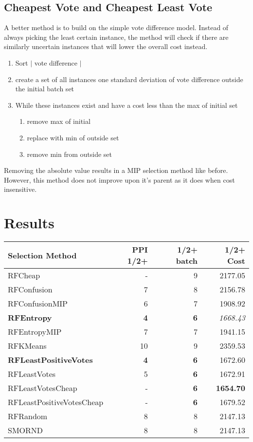 \documentclass[10pt,a4pape r]{article}
\begin{document}
\subsection{Cheapest Vote and Cheapest Least Vote}
A better method is to build on the simple vote difference model. Instead of always picking the least certain instance, the method will check if there are similarly uncertain instances that will lower the overall cost instead.
\begin{enumerate}
 \item Sort $\vert$  vote difference $\vert$
 \item create a set of all instances one standard deviation of vote difference outside the initial batch set
 \item While these instances exist and have a cost less than the max of initial set
 \begin{enumerate}
  \item remove max of initial
  \item replace with min of outside set
  \item remove min from outside set
  \end{enumerate}
\end{enumerate}

Removing the absolute value results in a MIP selection method like before. However, this method does not improve upon it's parent as it does when cost insensitive. \\ 

\section{Results}
 \begin{centering}
\begin{small}
\begin{tabular}{l|rrr}
Selection Method&	PPI 1/2+&	1/2+ batch&	1/2+ Cost\\\hline
RFCheap&	-&	9&	2177.05\\
RFConfusion &	7&	8&	2156.78\\
RFConfusionMIP&	6&	7&	1908.92\\
\textbf{RFEntropy}&	\textbf{4}&	\textbf{6}&	\em{1668.43}\\
RFEntropyMIP&	7&	7&	1941.15\\
RFKMeans&	10&	9&	2359.53\\
\textbf{RFLeastPositiveVotes}&	\textbf{4}&	\textbf{6}&	1672.60\\
RFLeastVotes&	5&	\textbf{6}&	1672.91\\
RFLeastVotesCheap&	-&	\textbf{6}&	\textbf{1654.70}\\
RFLeastPositiveVotesCheap&	-&	\textbf{6}&	1679.52\\
RFRandom&	8&	8&	2147.13\\
SMORND&	8&	8&	2147.13\\  
\end{tabular} 
\end{small}
\end{centering}
\end{document}
